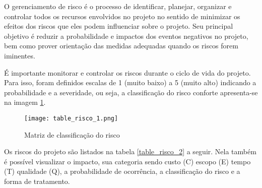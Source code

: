 		O gerenciamento de risco é o processo de identificar, planejar, organizar e controlar todos os recursos envolvidos no projeto no sentido de minimizar os efeitos dos riscos que eles podem influenciar sobre o projeto. Seu principal objetivo é reduzir a probabilidade e impactos dos eventos negativos no projeto, bem como prover orientação das medidas adequadas quando os riscos forem iminentes. 
		
		É importante monitorar e controlar os riscos durante o ciclo de vida do projeto. Para isso, foram definidos escalas de 1 (muito baixo) a 5 (muito alto) indicando a probabilidade e a severidade, ou seja, a classificação do risco conforte apresenta-se na imagem \ref{table_risco_1}.

		\begin{figure}[!h]
			\centering
			\texttt{[image: table\_risco\_1.png]}
			\caption{Matriz de classificação do risco}
			\label{table_risco_1}
		\end{figure}

		Os riscos do projeto são listados na tabela \ref{table_risco_2} a seguir. Nela também é possível visualizar o impacto, sua categoria sendo custo (C) escopo (E) tempo (T) qualidade (Q), a probabilidade de ocorrência, a classificação do risco e a forma de tratamento.

